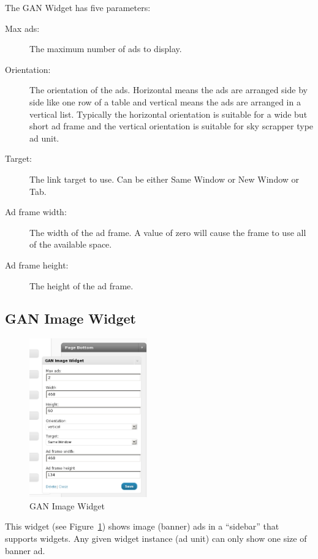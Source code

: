 \documentclass[letterpaper]{article}
\begin{document}
The GAN Widget has five parameters:
\begin{description}
  \item[Max ads:] The maximum number of ads to display.
  \item[Orientation:] The orientation of the ads. Horizontal
means the ads are arranged side by side like one row of a table and
vertical means the ads are arranged in a vertical list. Typically the
horizontal orientation is suitable for a wide but short ad frame and the
vertical orientation is suitable for sky scrapper type ad unit.
  \item[Target:] The link target to use. Can be either Same 
Window or New Window or Tab.
  \item[Ad frame width:] The width of the ad frame. A value
of zero will cause the frame to use all of the available space.
  \item[Ad frame height:] The height of the ad frame.
\end{description}

\subsection{GAN Image Widget}

\begin{figure}[ht]
\begin{centering}
\includegraphics[width=2in]{ganimagewidget.png}
\caption{GAN Image Widget}
\label{fig:ganimagewidget}
\end{centering}
\end{figure}
This widget (see Figure~\ref{fig:ganimagewidget}) shows image (banner) 
ads in a ``sidebar'' that supports widgets.  Any given widget instance
(ad unit) can only show one size of banner ad.
\end{document}
